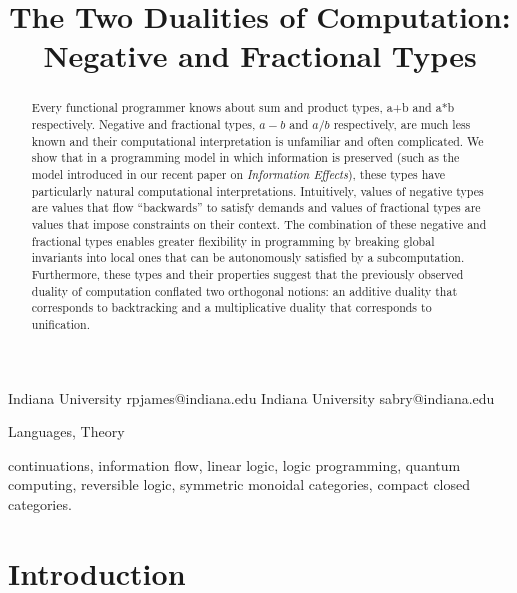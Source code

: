 \documentclass[preprint]{sigplanconf}
\begin{document}
\CopyrightYear{}
\copyrightdata{}
\titlebanner{}
\preprintfooter{}

\title{The Two Dualities of Computation: Negative and Fractional Types}
           {Indiana University}
           {rpjames@indiana.edu}
           {Indiana University}
           {sabry@indiana.edu}
\maketitle

\begin{abstract}
  Every functional programmer knows about sum and product types, {{a+b}} and
  {{a*b}} respectively. Negative and fractional types, $a-b$ and $a/b$
  respectively, are much less known and their computational interpretation is
  unfamiliar and often complicated. We show that in a programming model in
  which information is preserved (such as the model introduced in our recent
  paper on \emph{Information Effects}), these types have particularly natural
  computational interpretations. Intuitively, values of negative types are
  values that flow ``backwards'' to satisfy demands and values of fractional
  types are values that impose constraints on their context.  The combination
  of these negative and fractional types enables greater flexibility in
  programming by breaking global invariants into local ones that can be
  autonomously satisfied by a subcomputation. Furthermore, these types and
  their properties suggest that the previously observed duality of
  computation conflated two orthogonal notions: an additive duality that
  corresponds to backtracking and a multiplicative duality that corresponds
  to unification.
\end{abstract}


\terms
Languages, Theory

\keywords continuations, information flow, linear logic, logic programming,
quantum computing, reversible logic, symmetric monoidal categories, compact
closed categories.

\section{Introduction}
\end{document}

